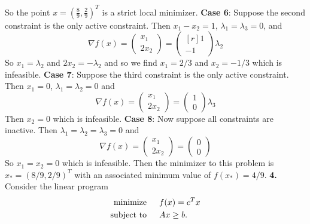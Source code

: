 \documentclass{article}
\begin{document}
So the point $x = (\frac{8}{9},\frac{2}{9})^T$ is a strict local minimizer.
\newline\newline
\textbf{Case 6}: Suppose the second constraint is the only active constraint. Then $x_1 - x_2 = 1$, $\lambda_1 = \lambda_3 = 0$, and
\[\nabla f(x) = \begin{pmatrix}
    x_1\\
    2x_2
\end{pmatrix} = \begin{pmatrix*}[r]
    1\\
    -1
\end{pmatrix*}\lambda_2\]
So $x_1 = \lambda_2$ and $2x_2 = -\lambda_2$ and so we find $x_1 = 2/3$ and $x_2 = -1/3$ which is infeasible.
\newline\newline
\textbf{Case 7}: Suppose the third constraint is the only active constraint. Then $x_1 = 0$, $\lambda_1 = \lambda_2 = 0$ and
\[\nabla f(x) = \begin{pmatrix*}
    x_1\\
    2x_2
\end{pmatrix*} = \begin{pmatrix}
    1\\
    0
\end{pmatrix}\lambda_3\]
Then $x_2 = 0$ which is infeasible.
\newline\newline
\textbf{Case 8}: Now suppose all constraints are inactive. Then $\lambda_1 = \lambda_2 = \lambda_3 = 0$ and
\[\nabla f(x) = \begin{pmatrix}
    x_1\\
    2x_2
\end{pmatrix} = \begin{pmatrix}
    0\\
    0
\end{pmatrix}\]
So $x_1 = x_2 = 0$ which is infeasible.
\newline\newline
Then the minimizer to this problem is $x_* = (8/9, 2/9)^T$ with an associated minimum value of $f(x_*) = 4/9$.
\newline\newline\newline
\textbf{4.} Consider the linear program 
\begin{align*}
    \text{minimize} \hspace{1.5em} &f(x) = c^Tx\\
    \text{subject to} \hspace{1.5em} &Ax \geq b.
\end{align*}
\end{document}
